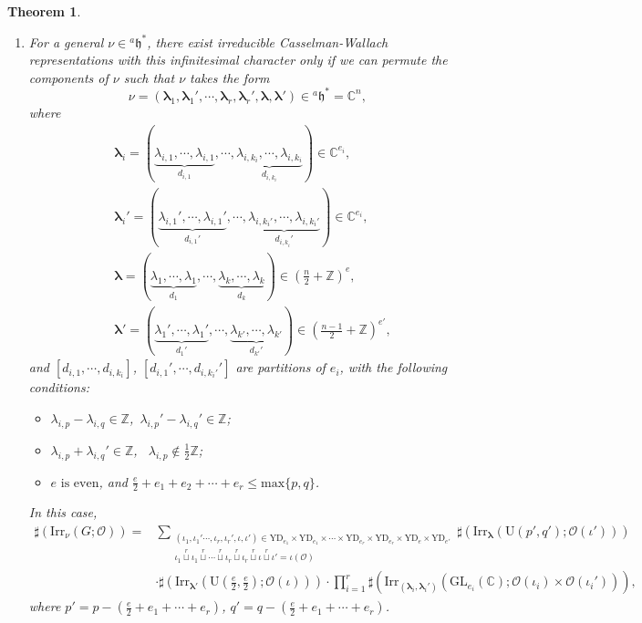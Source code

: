 \documentclass[12pt, a4paper]{amsart}
\numberwithin{equation}{section}
\newtheorem{thm}{Theorem}[section]
\newcommand{\blam}{{\boldsymbol{\lambda}}}
\newcommand{\BC}{{\mathbb {C}}}
\newcommand{\BZ}{{\mathbb {Z}}}
\newcommand{\CO}{{\mathcal {O}}}
\newcommand{\fh}{\mathfrak{h}}
\newcommand{\GL}{{\mathrm{GL}}}
\newcommand{\U}{{\mathrm{U}}}
\newcommand{\Irr}{{\mathrm{Irr}}}
\begin{document}
\begin{thm}
\begin{enumerate}
        \item For a general $\nu \in {^{a}\fh^*}$, there exist irreducible Casselman-Wallach representations with this infinitesimal character only if we can permute the components of $\nu$ such that $\nu$ takes the form
        \[
            \nu = (\blam_1, \blam_1', \cdots, \blam_r, \blam_r', \blam, \blam') \in {^{a}\fh}^* = \BC^n,
        \]
        where 
        \begin{align} 
            &\blam_i = (\underbrace{\lambda_{i,1}, \cdots, \lambda_{i,1}}_{d_{i,1}}, \cdots, \underbrace{\lambda_{i,k_i}, \cdots, \lambda_{i,k_i}}_{d_{i,k_i}}) \in \BC^{e_i},\\
            &\blam_i' = (\underbrace{\lambda_{i,1}', \cdots, \lambda_{i,1}'}_{d_{i,1}'}, \cdots, \underbrace{\lambda_{i,k_i'}, \cdots, \lambda_{i,k_i'}}_{d_{i,k_i}'}) \in \BC^{e_i},\\
            &\blam = (\underbrace{\lambda_1, \cdots, \lambda_1}_{d_1}, \cdots, \underbrace{\lambda_k, \cdots, \lambda_k}_{d_k}) \in \left(\frac{n}{2} + \BZ\right)^{e},\\
            &\blam' = (\underbrace{\lambda_1', \cdots, \lambda_1'}_{d_1'}, \cdots, \underbrace{\lambda_{k'}, \cdots, \lambda_{k'}}_{d_{k'}'}) \in \left(\frac{n-1}{2} + \BZ\right)^{e'},
        \end{align}
        and $[d_{i,1}, \cdots, d_{i,k_i}]$, $[d_{i,1}', \cdots, d_{i,k_i'}']$ are partitions of $e_i$, with the following conditions: 
        \begin{itemize}
            \item $\lambda_{i,p} - \lambda_{i,q} \in \BZ$,\ $\lambda_{i,p}' - \lambda_{i,q}' \in \BZ$;
            \item $\lambda_{i,p} + \lambda_{i,q}' \in \BZ$, \ $\lambda_{i,p} \notin \frac{1}{2}\BZ$;
            \item $e \text{ is even}$, and $\frac{e}{2} + e_1 + e_2 + \cdots + e_r \leq \mathrm{max}\{p,q\}$.
        \end{itemize}
        In this case, 
        \begin{align*}
            \sharp(\Irr_{\nu}(G;\CO)) = & \sum_{\substack{( \iota_1,\iota_1' \cdots,\iota_r, \iota_r',\iota, \iota') \in   \mathrm{YD}_{e_1} \times \mathrm{YD}_{e_1} \times \cdots \times \mathrm{YD}_{e_r} \times \mathrm{YD}_{e_r} \times \mathrm{YD}_{e} \times \mathrm{YD}_{e'} \\   \iota_1 \mathop{\sqcup}\limits^r \iota_1 \mathop{\sqcup}\limits^r \cdots  \mathop{\sqcup}\limits^r \iota_r \mathop{\sqcup}\limits^r \iota_r \mathop{\sqcup}\limits^r \iota \mathop{\sqcup}\limits^r \iota' = \iota(\CO)}} \sharp(\Irr_{\blam}(\U(p',q');\CO(\iota')))\\
            & \cdot \sharp(\Irr_{\blam'}(\U(\frac{e}{2},\frac{e}{2});\CO(\iota)))\cdot \prod_{i=1}^{r} \sharp(\Irr_{(\blam_i,\blam_i')}(\GL_{e_i}(\BC);\CO(\iota_i)\times \CO(\iota_i'))),
        \end{align*}
        where $p' = p - (\frac{e}{2} + e_1 + \cdots + e_r) $, $q' = q - (\frac{e}{2} + e_1 + \cdots + e_r)$.
    \end{enumerate}
\end{thm}
\end{document}

